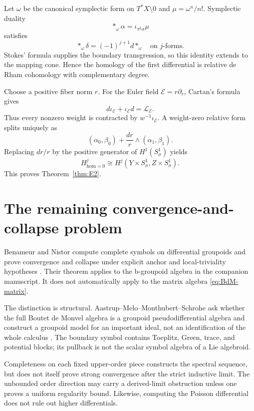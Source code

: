 \documentclass[11pt,oneside,reqno]{article}
\theoremstyle{plain}
\theoremstyle{definition}
\theoremstyle{remark}
\begin{document}
Let \(\omega\) be the canonical symplectic form on \(T^*X\setminus0\) and
\(\mu=\omega^n/n!\). Symplectic duality
\[
 *_\omega\alpha=\iota_{\pi^\sharp\alpha}\mu
\]
satisfies
\[
 *_\omega\delta=(-1)^{j+1}d*_\omega
 \quad\text{on \(j\)-forms}.
\]
Stokes' formula supplies the boundary transgression, so this identity extends
to the mapping cone. Hence the homology of the first differential is relative
de Rham cohomology with complementary degree.

Choose a positive fiber norm \(r\). For the Euler field
\(\mathcal E=r\partial_r\), Cartan's formula gives
\[
 d\iota_{\mathcal E}+\iota_{\mathcal E}d=\mathcal L_{\mathcal E}.
\]
Thus every nonzero weight is contracted by
\(w^{-1}\iota_{\mathcal E}\). A weight-zero relative form splits uniquely as
\[
 (\alpha_0,\beta_0)+\frac{dr}{r}\wedge(\alpha_1,\beta_1).
\]
Replacing \(dr/r\) by the positive generator of \(H^1(S^1_\sigma)\) yields
\[
 H^j_{\mathrm{hom}=0}\cong
 H^j(Y\times S^1_\sigma,Z\times S^1_\sigma).
\]
This proves Theorem~\ref{thm:E2}.

\section{The remaining convergence-and-collapse problem}

Benameur and Nistor compute complete symbols on differential groupoids and
prove convergence and collapse under explicit anchor and local-triviality
hypotheses \cite{BenameurNistorSymbols,BenameurNistorFamilies}. Their theorem
applies to the b-groupoid algebra in the companion manuscript. It does not
automatically apply to the matrix algebra \eqref{eq:BdM-matrix}.

The distinction is structural. Aastrup--Melo--Monthubert--Schrohe ask whether
the full Boutet de Monvel algebra is a groupoid pseudodifferential algebra and
construct a groupoid model for an important ideal, not an identification of
the whole calculus \cite{AMMS}. The boundary symbol contains Toeplitz, Green,
trace, and potential blocks; its pullback is not the scalar symbol algebra of
a Lie algebroid.

Completeness on each fixed upper-order piece constructs the spectral
sequence, but does not itself prove strong convergence after the strict
inductive limit. The unbounded order direction may carry a derived-limit
obstruction unless one proves a uniform regularity bound. Likewise, computing
the Poisson differential does not rule out higher differentials.
\end{document}
